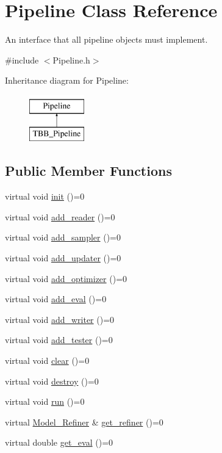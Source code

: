 \hypertarget{class_pipeline}{
\section{Pipeline Class Reference}
\label{class_pipeline}
}


An interface that all pipeline objects must implement.  




{\ttfamily \#include $<$Pipeline.h$>$}

Inheritance diagram for Pipeline:\begin{figure}[H]
\begin{center}
\leavevmode
\includegraphics[height=2cm]{class_pipeline}
\end{center}
\end{figure}
\subsection*{Public Member Functions}
\begin{DoxyCompactItemize}
\item 
virtual void \hyperlink{class_pipeline_a4ebb79a6018c72d196f480a4300ac302}{init} ()=0
\item 
virtual void \hyperlink{class_pipeline_a7919be26846bd13f614f823f180aec42}{add\_\-reader} ()=0
\item 
virtual void \hyperlink{class_pipeline_aa1bdee70f85f452a2f68c67313d8b2d0}{add\_\-sampler} ()=0
\item 
virtual void \hyperlink{class_pipeline_a60f948a86dd41079ea887a77a0a3614e}{add\_\-updater} ()=0
\item 
virtual void \hyperlink{class_pipeline_accee7285f24478fa58ad34a9d6bca1f4}{add\_\-optimizer} ()=0
\item 
virtual void \hyperlink{class_pipeline_aa6fd3ded1ad9d36ced67ee2f888edd80}{add\_\-eval} ()=0
\item 
virtual void \hyperlink{class_pipeline_a0dc7f98daffefe534ff469ab3c8336b9}{add\_\-writer} ()=0
\item 
virtual void \hyperlink{class_pipeline_afbc6eaee843ebceca849ed9a5078bd9c}{add\_\-tester} ()=0
\item 
virtual void \hyperlink{class_pipeline_a4d58883c3b93f17c56c65474e0179bcb}{clear} ()=0
\item 
virtual void \hyperlink{class_pipeline_aa8eaf1bc52b077b4483f28bd97c60abe}{destroy} ()=0
\item 
virtual void \hyperlink{class_pipeline_a6d2bae2931edbb5177e1f1aec27ab9c6}{run} ()=0
\item 
virtual \hyperlink{class_model___refiner}{Model\_\-Refiner} \& \hyperlink{class_pipeline_af75e9044b4f846daf5dd09064e74b85c}{get\_\-refiner} ()=0
\item 
virtual double \hyperlink{class_pipeline_aabb2894f21a40ef218d08b48e0056671}{get\_\-eval} ()=0
\end{DoxyCompactItemize}


